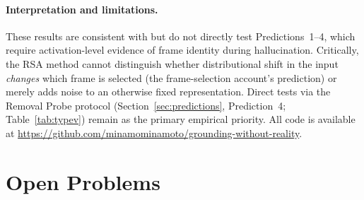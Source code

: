 \documentclass[12pt]{article}
\begin{document}
\paragraph{Interpretation and limitations.}
These results are consistent with but do not directly test
Predictions~1--4, which require activation-level evidence
of frame identity during hallucination.
Critically, the RSA method cannot distinguish whether
distributional shift in the input \emph{changes} which
frame is selected (the frame-selection account's prediction)
or merely adds noise to an otherwise fixed representation.
Direct tests via the Removal Probe protocol
(Section~\ref{sec:predictions}, Prediction~4;
Table~\ref{tab:typev}) remain as the primary empirical priority.
All code is available at
\url{https://github.com/minamominamoto/grounding-without-reality}.

\section{Open Problems}
\end{document}

